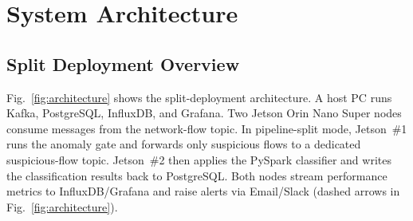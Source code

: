 \documentclass[runningheads]{llncs}
\begin{document}
\section{System Architecture}

\subsection{Split Deployment Overview}

Fig.~\ref{fig:architecture} shows the split-deployment architecture. A host PC runs Kafka, PostgreSQL, InfluxDB, and Grafana. Two Jetson Orin Nano Super nodes consume messages from the network-flow topic. In pipeline-split mode, Jetson~\#1 runs the anomaly gate and forwards only suspicious flows to a dedicated suspicious-flow topic. Jetson~\#2 then applies the PySpark classifier and writes the classification results back to PostgreSQL. Both nodes stream performance metrics to InfluxDB/Grafana and raise alerts via Email/Slack (dashed arrows in Fig.~\ref{fig:architecture}).
\end{document}
